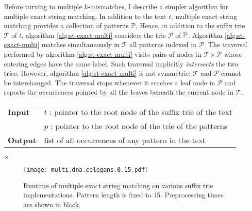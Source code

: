 Before turning to multiple $k$-mismatches, I describe a simpler algorithm for multiple exact string matching.
In addition to the text $t$, multiple exact string matching provides a collection of patterns $\mathbb{P}$.
Hence, in addition to the suffix trie $\mathcal{T}$ of $t$, algorithm \ref{alg:st-exact-multi} considers the trie $\mathcal{P}$ of $\mathbb{P}$.
Algorithm \ref{alg:st-exact-multi} matches simultaneously in $\mathcal{T}$ all patterns indexed in $\mathcal{P}$.
The traversal performed by algorithm \ref{alg:st-exact-multi} visits pairs of nodes in $\mathcal{T} \times \mathcal{P}$ whose entering edges have the same label.
Such traversal implicitly \emph{intersects} the two tries.
However, algorithm \ref{alg:st-exact-multi} is not symmetric: $\mathcal{T}$ and $\mathcal{P}$ cannot be interchanged.
The traversal stops whenever it reaches a leaf node in $\mathcal{P}$ and reports the occurrences pointed by all the leaves beneath the current node in $\mathcal{T}$.

\begin{figure*}[t]
\begin{center}
\begin{minipage}[t]{.8\textwidth}
\begin{algorithm}[H]
\begin{tabular}{ll}
\textbf{Input}  & $t$ : pointer to the root node of the suffix trie of the text\\
 			    & $p$ : pointer to the root node of the trie of the patterns\\
\textbf{Output} & list of all occurrences of any pattern in the text\\
\end{tabular}
\begin{algorithmic}[1]
	\State \Report {} $\times$ 
\Else
	\State {}
	\Repeat
			\State {}
			\State {}
		\EndIf
\EndIf
\end{algorithmic}
\label{alg:st-exact-multi}
\end{algorithm}
\end{minipage}
\end{center}
\end{figure*}

\begin{figure}[b]
\begin{center}
\caption[Multiple exact string matching runtime]{Runtime of multiple exact string matching on various suffix trie implementations. Pattern length is fixed to 15. Preprocessing times are shown in black.}
\label{fig:query-dna-exact-multi}
\texttt{[image: multi.dna.celegans.0.15.pdf]}
\end{center}
\end{figure}

